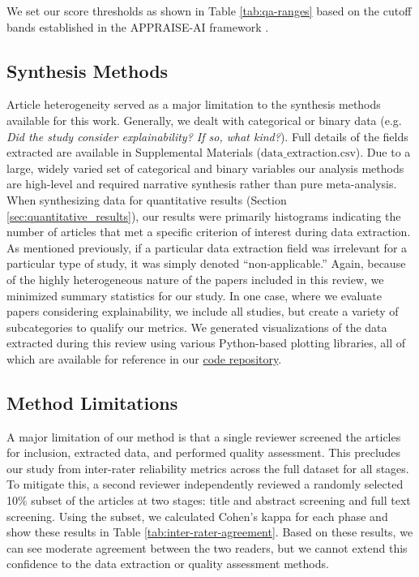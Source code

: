 \documentclass[authoryear,preprint,12pt]{elsarticle}
\begin{document}
 We set our score thresholds as shown in Table \ref{tab:qa-ranges} based on the
 cutoff bands established in the APPRAISE-AI framework
 \cite{kwongAPPRAISEAIToolQuantitative2023}. 
 \FloatBarrier

\subsection{Synthesis Methods}
Article heterogeneity served as a major limitation to the synthesis methods
available for this work. Generally, we dealt with categorical or binary data
(e.g. \textit{Did the study consider explainability? If so, what kind?}). Full
details of the fields extracted are available in Supplemental Materials
($\text{data\_extraction.csv}$). Due to a large, widely varied set of categorical and
binary variables our analysis methods are high-level and required narrative synthesis rather than pure meta-analysis. When synthesizing data for quantitative results (Section \ref{sec:quantitative_results}), our results were primarily histograms indicating the number of articles that met a specific criterion of interest during data extraction. As mentioned previously, if a particular data extraction field was irrelevant for a particular type of study, it was simply denoted ``non-applicable.'' Again, because of the highly heterogeneous nature of the papers included in this review, we minimized summary statistics for our study. In one case, where we evaluate papers considering explainability, we include all studies, but create a variety of subcategories to qualify our metrics. We generated visualizations of the data extracted during this review using various Python-based plotting libraries, all of which are available for reference in our \href{https://github.com/aims-umich/2025-panczyk-slr}{code repository}.

\subsection{Method Limitations}
A major limitation of our method is that a single reviewer screened the articles
for inclusion, extracted data, and performed quality assessment. This precludes
our study from inter-rater reliability metrics across the full dataset for all
stages. To mitigate this, a second reviewer independently reviewed a randomly
selected 10\% subset of the articles at two stages: title and abstract screening
and full text screening. Using the subset, we calculated Cohen's kappa for each
phase and show these results in Table \ref{tab:inter-rater-agreement}. Based on
these results, we can see moderate agreement \cite{landisMeasurementObserverAgreement1977} between the two readers, but we
cannot extend this confidence to the data extraction or quality assessment
methods. 
\end{document}
